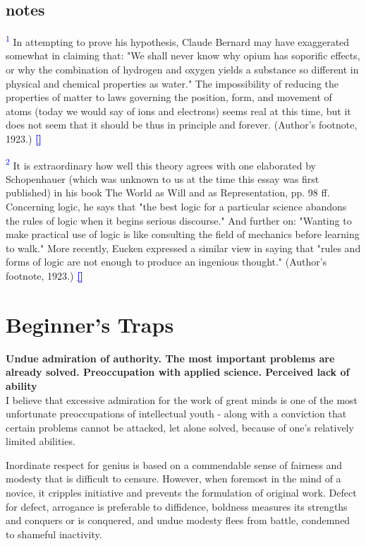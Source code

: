 \documentclass{article}
\newcommand{\boldline}[1]{%
 \vspace{\baselineskip}%
 \noindent\textbf{#1}\\[0.5\baselineskip]%
}
\newcommand{\notetext}[2]{
 \par\noindent
 \hypertarget{note:#1}{\textsuperscript{\textcolor{blue}{#1}}} #2
 \hyperlink{ref:#1}{\textcolor{blue}{\textbf{[\textuparrow]}}}
 \par\vspace{1em}
}
\begin{document}
\subsection*{notes}

\notetext{1}{In attempting to prove his hypothesis, Claude Bernard may have exaggerated somewhat in claiming that: "We shall never know why opium has soporific effects, or why the combination of hydrogen and oxygen yields a substance so different in physical and chemical properties as water." The impossibility of reducing the properties of matter to laws governing the position, form, and movement of atoms (today we would say of ions and electrons) seems real at this time, but it does not seem that it should be thus in principle and forever. (Author’s footnote, 1923.)}

\notetext{2}{It is extraordinary how well this theory agrees with one elaborated by Schopenhauer (which was unknown to us at the time this essay was first published) in his book The World as Will and as Representation, pp. 98 ff. Concerning logic, he says that "the best logic for a particular science abandons the rules of logic when it begins serious discourse." And further on: "Wanting to make practical use of logic is like consulting the field of mechanics before learning to walk." More recently, Eucken expressed a similar view in saying that "rules and forms of logic are not enough to produce an ingenious thought." (Author’s footnote, 1923.)}

\newpage \section{Beginner's Traps}

\boldline{Undue admiration of authority. The most important problems are already solved. Preoccupation with applied science. Perceived lack of ability}

I believe that excessive admiration for the work of great minds is one of the most unfortunate preoccupations of intellectual youth - along with a conviction that certain problems cannot be attacked, let alone solved, because of one’s relatively limited abilities.

Inordinate respect for genius is based on a commendable sense of fairness and modesty that is difficult to censure. However, when foremost in the mind of a novice, it cripples initiative and prevents the formulation of original work. Defect for defect, arrogance is preferable to diffidence, boldness measures its strengths and conquers or is conquered, and undue modesty flees from battle, condemned to shameful inactivity.
\end{document}
